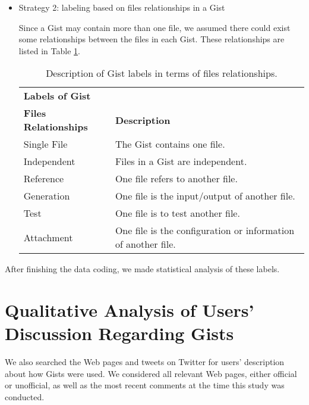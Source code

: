 \begin{itemize}
  \item Strategy 2: labeling based on files relationships in a Gist

  Since a Gist may contain more than one file, we assumed there could exist some relationships between the files in each Gist. These relationships are listed in Table \ref{tb:gistfilerelationshiplabels}.

\begin{table}[!htb]
 \begin{center}
 \begin{tabular}{ll} 
    \textbf{Labels of Gist}	&	\\ 
    \textbf{Files Relationships}	& \textbf{Description}	\\  \hline
    Single File & The Gist contains one file.\\
    Independent & Files in a Gist are independent.\\
    Reference & One file refers to another file.\\ 
    Generation & One file is the input/output of another file.\\ 
    Test & One file is to test another file.\\ 
    Attachment & One file is the configuration or information of another file.\\ \hline
 \end{tabular}
 \end{center}
 \caption{Description of Gist labels in terms of files relationships.}
 \label{tb:gistfilerelationshiplabels}
\end{table}

\end{itemize}

After finishing the data coding, we made statistical analysis of these labels.

\section{Qualitative Analysis of Users' Discussion Regarding Gists}

We also searched the Web pages and tweets on Twitter for users' description about how Gists were used. We considered all relevant Web pages, either official or unofficial, as well as the most recent comments at the time this study was conducted. 

